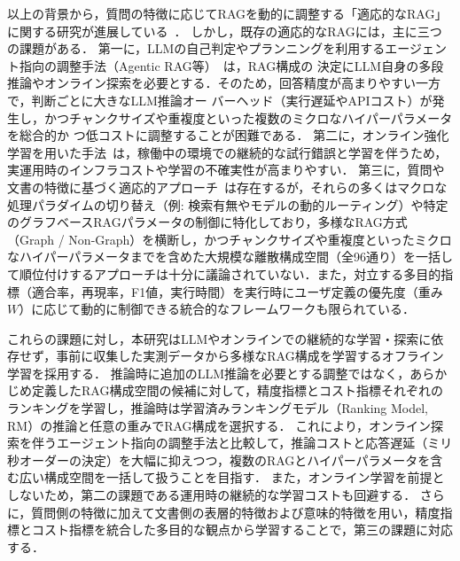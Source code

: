 以上の背景から，質問の特徴に応じてRAGを動的に調整する「適応的なRAG」に関する研究が進展している~\cite{Asai23,fu24,Tang25,Rishi25,zhang2025adagcrag}．
しかし，既存の適応的なRAGには，主に三つの課題がある．
    第一に，LLMの自己判定やプランニングを利用するエージェント指向の調整手法（Agentic RAG等）~\cite{Asai23}は，RAG構成の
決定にLLM自身の多段推論やオンライン探索を必要とする．そのため，回答精度が高まりやすい一方で，判断ごとに大きなLLM推論オー
バーヘッド（実行遅延やAPIコスト）が発生し，かつチャンクサイズや重複度といった複数のミクロなハイパーパラメータを総合的か
つ低コストに調整することが困難である．
    第二に，オンライン強化学習を用いた手法~\cite{fu24,Tang25}は，稼働中の環境での継続的な試行錯誤と学習を伴うため，実運用時のインフラコストや学習の不確実性が高まりやすい．
    第三に，質問や文書の特徴に基づく適応的アプローチ~\cite{Rishi25,zhang2025adagcrag}は存在するが，それらの多くはマクロな処理パラダイムの切り替え（例: 検索有無やモデルの動的ルーティング）や特定のグラフベースRAGパラメータの制御に特化しており，多様なRAG方式（Graph / Non-Graph）を横断し，かつチャンクサイズや重複度といったミクロなハイパーパラメータまでを含めた大規模な離散構成空間（全96通り）を一括して順位付けするアプローチは十分に議論されていない．また，対立する多目的指標（適合率，再現率，F1値，実行時間）を実行時にユーザ定義の優先度（重み $W$）に応じて動的に制御できる統合的なフレームワークも限られている．

これらの課題に対し，本研究はLLMやオンラインでの継続的な学習・探索に依存せず，事前に収集した実測データから多様なRAG構成を学習するオフライン学習を採用する．
推論時に追加のLLM推論を必要とする調整ではなく，あらかじめ定義したRAG構成空間の候補に対して，精度指標とコスト指標それぞれのランキングを学習し，推論時は学習済みランキングモデル（Ranking Model, RM）の推論と任意の重みでRAG構成を選択する．
これにより，オンライン探索を伴うエージェント指向の調整手法と比較して，推論コストと応答遅延（ミリ秒オーダーの決定）を大幅に抑えつつ，複数のRAGとハイパーパラメータを含む広い構成空間を一括して扱うことを目指す．
また，オンライン学習を前提としないため，第二の課題である運用時の継続的な学習コストも回避する．
さらに，質問側の特徴に加えて文書側の表層的特徴および意味的特徴を用い，精度指標とコスト指標を統合した多目的な観点から学習することで，第三の課題に対応する．

